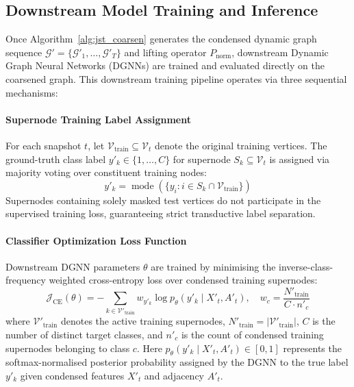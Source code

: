 \documentclass[sigconf]{acmart}
\begin{document}
\subsection{Downstream Model Training and Inference}
\label{sec:downstream_pipeline}
Once Algorithm~\ref{alg:jst_coarsen} generates the condensed dynamic graph sequence $\mathcal{G}' = \{\mathcal{G}'_1, \dots, \mathcal{G}'_T\}$ and lifting operator $P_{\text{norm}}$, downstream Dynamic Graph Neural Networks (DGNNs) are trained and evaluated directly on the coarsened graph. This downstream training pipeline operates via three sequential mechanisms:

\paragraph{Supernode Training Label Assignment}
For each snapshot $t$, let $\mathcal{V}_{\text{train}} \subseteq \mathcal{V}_t$ denote the original training vertices. The ground-truth class label $y'_k \in \{1, \dots, C\}$ for supernode $S_k \subseteq \mathcal{V}_t$ is assigned via majority voting over constituent training nodes:
\[
y'_k = \operatorname{mode}\left(\{y_i : i \in S_k \cap \mathcal{V}_{\text{train}}\}\right)
\]
Supernodes containing solely masked test vertices do not participate in the supervised training loss, guaranteeing strict transductive label separation.

\paragraph{Classifier Optimization Loss Function}
Downstream DGNN parameters $\theta$ are trained by minimising the inverse-class-frequency weighted cross-entropy loss over condensed training supernodes:
\begin{equation}
\label{eq:loss}
\mathcal{J}_{\text{CE}}(\theta) = -\sum_{k \in \mathcal{V}'_{\text{train}}} w_{y'_k} \log p_\theta(y'_k \mid X'_t, A'_t), \quad w_c = \frac{N'_{\text{train}}}{C \cdot n'_c}
\end{equation}
where $\mathcal{V}'_{\text{train}}$ denotes the active training supernodes, $N'_{\text{train}} = |\mathcal{V}'_{\text{train}}|$, $C$ is the number of distinct target classes, and $n'_c$ is the count of condensed training supernodes belonging to class $c$. Here $p_\theta(y'_k \mid X'_t, A'_t) \in [0, 1]$ represents the softmax-normalised posterior probability assigned by the DGNN to the true label $y'_k$ given condensed features $X'_t$ and adjacency $A'_t$.
\end{document}
